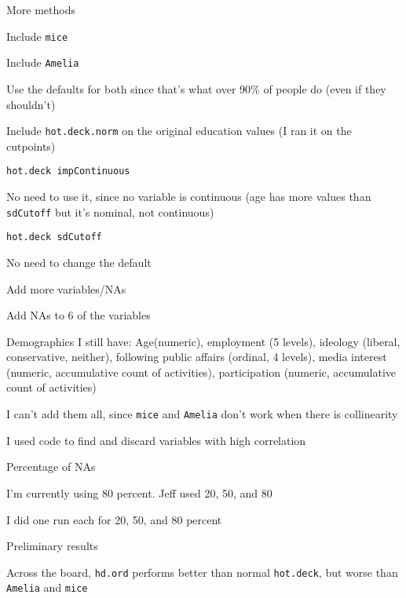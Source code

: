 \begin{coi}
		\item More methods
			\begin{coi}
				\item Include \texttt{mice}
				\item Include \texttt{Amelia}
				\item Use the defaults for both since that's what over 90\% of people do (even if they shouldn't)
				\item Include \texttt{hot.deck.norm} on the original education values (I ran it on the cutpoints)
			\end{coi}
		\item \texttt{hot.deck impContinuous}
			\begin{coi}
				\item No need to use it, since no variable is continuous (age has more values than \texttt{sdCutoff} but it's nominal, not continuous)
			\end{coi}
		\item \texttt{hot.deck sdCutoff}
			\begin{coi}
				\item No need to change the default
			\end{coi}
		\item Add more variables/NAs
			\begin{coi}
				\item Add NAs to 6 of the variables
				\item Demographics I still have: Age(numeric), employment (5 levels), ideology (liberal, conservative, neither), following public affairs (ordinal, 4 levels), media interest (numeric, accumulative count of activities), participation (numeric, accumulative count of activities)
				\item I can't add them all, since \texttt{mice} and \texttt{Amelia} don't work when there is collinearity
				\item I used code to find and discard variables with high correlation
			\end{coi}
		\item Percentage of NAs
			\begin{coi}
				\item I'm currently using 80 percent. Jeff used 20, 50, and 80
				\item I did one run each for 20, 50, and 80 percent
			\end{coi}
		\item Preliminary results
			\begin{coi}
				\item Across the board, \texttt{hd.ord} performs better than normal \texttt{hot.deck}, but worse than \texttt{Amelia} and \texttt{mice}

\end{coi}
\end{coi}
